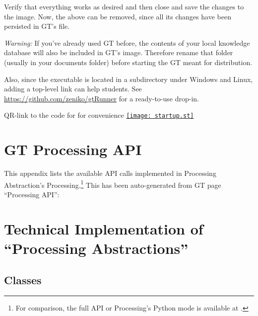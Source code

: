 Verify that everything works as desired and then close and save the changes to the image. Now, the above  can be removed, since all its changes have been persisted in \ac{GT}'s  file.

\emph{Warning:} If you've already used \ac{GT} before, the contents of your local knowledge database will also be included in \ac{GT}'s image. Therefore rename that folder (usually  in your documents folder) before starting the \ac{GT} meant for distribution.

Also, since the executable  is located in a subdirectory under Windows and Linux, adding a top-level link can help students. See \url{https://github.com/zeniko/gtRunner} for a ready-to-use drop-in.

\begin{cfigure}{QR-link to the code for  for convenience}
\href{https://github.com/zeniko/gyminf-thesis/blob/main/appendix.tex}{\texttt{[image: startup.st]}}
\end{cfigure}



\chapter{GT Processing API} \label{app_api}

This appendix lists the available \ac{API} calls implemented in Processing Abstraction's Processing.\footnote{For comparison, the full \ac{API} or Processing's Python mode is available at .} This has been auto-generated from \ac{GT} page ``Processing API'':





\chapter{Technical Implementation of ``Processing Abstractions''} \label{app_implementation}


\section{Classes}

